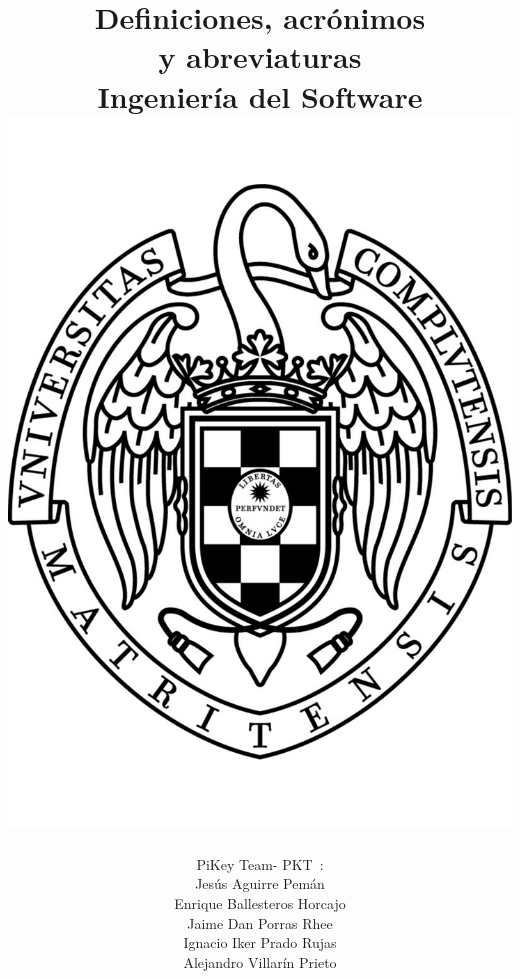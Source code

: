 \documentclass[spanish,a4paper,11pt, twoside]{report}	%
\newcommand*{\PKT}{\hbox{P}\kern-2.5pt\lower3.5pt\hbox{\small{K}}\kern-2.8pt\hbox{T}\kern-2pt}	%
\begin{document}
\title{\textbf{\huge{Definiciones, acrónimos \\ 
	y abreviaturas}} \\ \vspace{0.3cm}
	\Large{Ingeniería del Software} \\
	\includegraphics[scale=0.3]{ucm.pdf}}
\author{{\Large{PiKey Team-}} \PKT \ : \vspace{0.2cm} \\
	Jesús Aguirre Pemán \\
	 Enrique Ballesteros Horcajo \\
	 Jaime Dan Porras Rhee \\
	 Ignacio Iker Prado Rujas \\
	 Alejandro Villarín Prieto }
\date{\Today}
\maketitle
\end{document}
